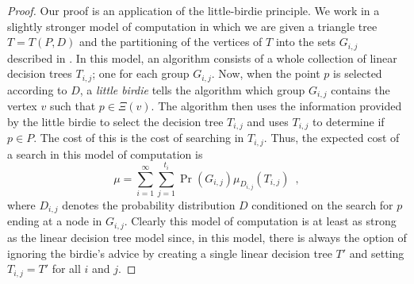 \documentclass[charterfonts,lotsofwhite]{patmorin}
\begin{document}
\begin{proof}
Our proof is an application of the little-birdie principle.    We work in a slightly stronger model of
computation in which we are given a triangle tree $T=T(P,D)$ and the partitioning of
the vertices of $T$ into the sets $G_{i,j}$ described in
.  In this model, an algorithm consists of a whole
collection of linear decision trees $T_{i,j}$; one for each group $G_{i,j}$.
Now, when the point $p$ is selected according to $D$, a \emph{little
birdie}
tells the algorithm which group $G_{i,j}$ contains the vertex $v$ such
that $p\in\Xi(v)$.  The algorithm then uses the information
provided by the little birdie to select the decision tree $T_{i,j}$
and uses $T_{i,j}$ to determine if $p\in P$.  The cost of this is the
cost of searching in $T_{i,j}$.  Thus, the expected cost of a search
in this model of computation is
\[
     \mu = \sum_{i=1}^\infty \sum_{j=1}^{t_i}
	\Pr(G_{i,j})\mu_{D_{i,j}}(T_{i,j}) \enspace ,
\]
where $D_{i,j}$ denotes the probability distribution $D$ conditioned
on the search for $p$ ending at a node in $G_{i,j}$.  Clearly this
model of computation is at least as strong as the linear decision tree
model since, in this model, there is always the option of ignoring the
birdie's advice by creating a single linear decision tree $T'$ and
setting $T_{i,j}=T'$ for all $i$ and $j$.


\end{proof}
\end{document}
